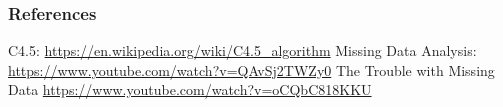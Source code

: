 \documentclass{beamer}
\begin{document}




\begin{frame}
\frametitle{References}
\footnotesize{
\begin{thebibliography}{9} %
C4.5: \url{https://en.wikipedia.org/wiki/C4.5_algorithm}
Missing Data Analysis: \url{https://www.youtube.com/watch?v=QAvSj2TWZy0}
The Trouble with Missing Data \url{https://www.youtube.com/watch?v=oCQbC818KKU}
\end{thebibliography}
}
\end{frame}



\end{document}
